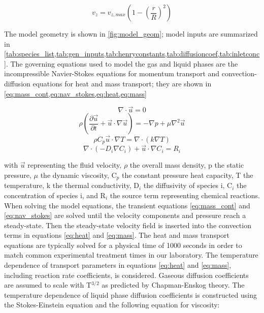 \documentclass[12pt]{article}
\begin{document}
\begin{equation}
    v_{z} = v_{z,max}\left(1-\left(\frac{r}{R}\right)^2\right)
    \label{eq:v_in}
\end{equation}

 The model geometry is shown in \cref{fig:model_geom}; model inputs are summarized in \cref{tab:species_list,tab:gen_inputs,tab:henryconstants,tab:diffusioncoef,tab:inletconc}. The governing equations used to model the gas and liquid phases are the incompressible Navier-Stokes equations for momentum transport and convection-diffusion equations for heat and mass transport; they are shown in \cref{eq:mass_cont,eq:nav_stokes,eq:heat,eq:mass}

\begin{equation}
    \nabla\cdot\vec{u}=0
    \label{eq:mass_cont}
\end{equation}
\begin{equation}    
    \rho \left(\frac{\partial\vec{u}}{\partial t}+\vec{u}\cdot\nabla\vec{u}\right)=-\nabla p+\mu \nabla^2 \vec{u}
    \label{eq:nav_stokes}
\end{equation}
\begin{equation}
    \rho C_p\vec{u}\cdot\nabla T = \nabla\cdot\left(k\nabla T\right)
    \label{eq:heat}
\end{equation}
\begin{equation}
    \nabla\cdot\left(-D_i\nabla C_i\right) + \vec{u}\cdot\nabla C_i = R_i
    \label{eq:mass}
\end{equation}

with $\vec{u}$ representing the fluid velocity, $\rho$ the overall mass density, p the static pressure, $\mu$ the dynamic viscosity, C$_p$ the constant pressure heat capacity, T the temperature, k the thermal conductivity, D$_i$ the diffusivity of species i, C$_i$ the concentration of species i, and R$_i$ the source term representing chemical reactions. When solving the model equations, the transient equations \ref{eq:mass_cont} and \ref{eq:nav_stokes} are solved until the velocity components and pressure reach a steady-state. Then the steady-state velocity field is inserted into the convection terms in equations \ref{eq:heat} and \ref{eq:mass}. The heat and mass transport equations are typically solved for a physical time of 1000 seconds in order to match common experimental treatment times in our laboratory. The temperature dependence of transport parameters in equations \ref{eq:heat} and \ref{eq:mass}, including reaction rate coefficients, is considered. Gaseous diffusion coefficients are assumed to scale with T$^{3/2}$ as predicted by Chapman-Enskog theory. \cite[p. 119]{cussler2009diffusion} The temperature dependence of liquid phase diffusion coefficients is constructed using the Stokes-Einstein equation \cite[p. 529]{bird2007transport} and the following equation for viscosity: \cite[p. 31]{bird2007transport} 
\end{document}
